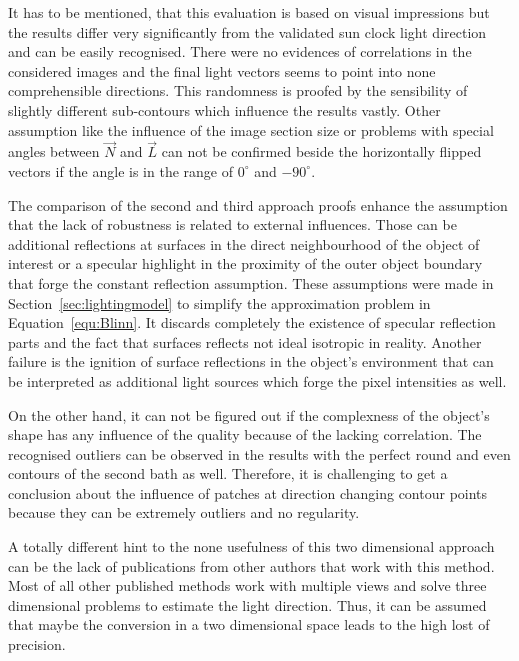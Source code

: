 It has to be mentioned, that this evaluation is based on visual impressions but the results differ very significantly from the validated sun clock light direction and can be easily recognised. There were no evidences of correlations in the considered images and the final light vectors seems to point into none comprehensible directions. This randomness is proofed by the sensibility of slightly different sub-contours which influence the results vastly. Other assumption like the influence of the image section size or problems with special angles between $\vec{N}$ and $\vec{L}$ can not be confirmed beside the horizontally flipped vectors if the angle is in the range of  $0^\circ $ and $-90^\circ$. 

The comparison of the second and third approach proofs enhance the assumption that the lack of robustness is related to external influences. Those can be additional reflections at surfaces in the direct neighbourhood of the object of interest or a specular highlight in the proximity of the outer object boundary that forge the constant reflection assumption. These assumptions were made in Section~\ref{sec:lightingmodel} to simplify the approximation problem in Equation~\ref{equ:Blinn}. It discards completely the existence of specular reflection parts and the fact that surfaces reflects not ideal isotropic in reality. Another failure is the ignition of surface reflections in the object's environment that can be interpreted as additional light sources which forge the pixel intensities as well. 

On the other hand, it can not be figured out if the complexness of the object's shape has any influence of the quality because of the lacking correlation. The recognised outliers can be observed in the results with the perfect round and even contours of the second bath as well. Therefore, it is challenging to get a conclusion about the influence of patches at direction changing contour points because they can be extremely outliers and no regularity.

A totally different hint to the none usefulness of this two dimensional approach can be the lack of publications from other authors that work with this method. Most of all other published methods work with multiple views and solve three dimensional problems to estimate the light direction. Thus, it can be assumed that maybe the conversion in a two dimensional space leads to the high lost of precision.

